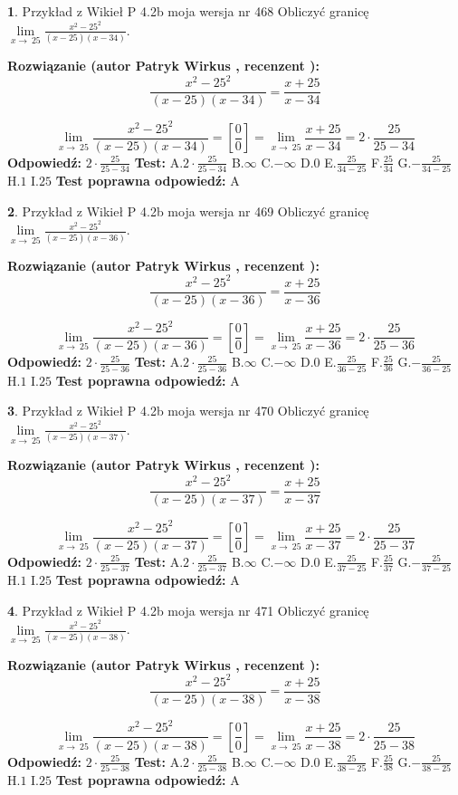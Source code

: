 \documentclass[12pt, a4paper]{article}
\theoremstyle{definition} %
\newtheorem{zad}{}
\newcommand{\zadStart}[1]{\begin{zad}#1\newline}
\newcommand{\zadStop}{\end{zad}}
\newcommand{\rozwStart}[2]{\noindent \textbf{Rozwiązanie (autor #1 , recenzent #2): }\newline}
\newcommand{\rozwStop}{\newline}
\newcommand{\odpStart}{\noindent \textbf{Odpowiedź:}\newline}
\newcommand{\odpStop}{\newline}
\newcommand{\testStart}{\noindent \textbf{Test:}\newline}
\newcommand{\testStop}{\newline}
\newcommand{\kluczStart}{\noindent \textbf{Test poprawna odpowiedź:}\newline}
\newcommand{\kluczStop}{\newline}
\begin{document}
\zadStart{Przykład z Wikieł P 4.2b moja wersja nr 468}
Obliczyć granicę $\lim\limits_{x\to\ 25}\frac{x^{2}-25^{2}}{(x-25)(x-34)}$.
\zadStop
\rozwStart{Patryk Wirkus}{}
$$\frac{x^{2}-25^{2}}{(x-25)(x-34)}=\frac{x+25}{x-34}$$

$$\lim\limits_{x\to\ 25}\frac{x^{2}-25^{2}}{(x-25)(x-34)}=[\frac{0}{0}]=\lim\limits_{x\to\ 25}\frac{x+25}{x-34}=2 \cdot \frac{25}{25-34}$$
\rozwStop
\odpStart
$2 \cdot \frac{25}{25-34}$
\odpStop
\testStart
A.$2 \cdot \frac{25}{25-34}$
B.$\infty$
C.$-\infty$
D.$0$
E.$\frac{25}{34-25}$
F.$\frac{25}{34}$
G.$-\frac{25}{34-25}$
H.$1$
I.$25$
\testStop
\kluczStart
A
\kluczStop



\zadStart{Przykład z Wikieł P 4.2b moja wersja nr 469}
Obliczyć granicę $\lim\limits_{x\to\ 25}\frac{x^{2}-25^{2}}{(x-25)(x-36)}$.
\zadStop
\rozwStart{Patryk Wirkus}{}
$$\frac{x^{2}-25^{2}}{(x-25)(x-36)}=\frac{x+25}{x-36}$$

$$\lim\limits_{x\to\ 25}\frac{x^{2}-25^{2}}{(x-25)(x-36)}=[\frac{0}{0}]=\lim\limits_{x\to\ 25}\frac{x+25}{x-36}=2 \cdot \frac{25}{25-36}$$
\rozwStop
\odpStart
$2 \cdot \frac{25}{25-36}$
\odpStop
\testStart
A.$2 \cdot \frac{25}{25-36}$
B.$\infty$
C.$-\infty$
D.$0$
E.$\frac{25}{36-25}$
F.$\frac{25}{36}$
G.$-\frac{25}{36-25}$
H.$1$
I.$25$
\testStop
\kluczStart
A
\kluczStop



\zadStart{Przykład z Wikieł P 4.2b moja wersja nr 470}
Obliczyć granicę $\lim\limits_{x\to\ 25}\frac{x^{2}-25^{2}}{(x-25)(x-37)}$.
\zadStop
\rozwStart{Patryk Wirkus}{}
$$\frac{x^{2}-25^{2}}{(x-25)(x-37)}=\frac{x+25}{x-37}$$

$$\lim\limits_{x\to\ 25}\frac{x^{2}-25^{2}}{(x-25)(x-37)}=[\frac{0}{0}]=\lim\limits_{x\to\ 25}\frac{x+25}{x-37}=2 \cdot \frac{25}{25-37}$$
\rozwStop
\odpStart
$2 \cdot \frac{25}{25-37}$
\odpStop
\testStart
A.$2 \cdot \frac{25}{25-37}$
B.$\infty$
C.$-\infty$
D.$0$
E.$\frac{25}{37-25}$
F.$\frac{25}{37}$
G.$-\frac{25}{37-25}$
H.$1$
I.$25$
\testStop
\kluczStart
A
\kluczStop



\zadStart{Przykład z Wikieł P 4.2b moja wersja nr 471}
Obliczyć granicę $\lim\limits_{x\to\ 25}\frac{x^{2}-25^{2}}{(x-25)(x-38)}$.
\zadStop
\rozwStart{Patryk Wirkus}{}
$$\frac{x^{2}-25^{2}}{(x-25)(x-38)}=\frac{x+25}{x-38}$$

$$\lim\limits_{x\to\ 25}\frac{x^{2}-25^{2}}{(x-25)(x-38)}=[\frac{0}{0}]=\lim\limits_{x\to\ 25}\frac{x+25}{x-38}=2 \cdot \frac{25}{25-38}$$
\rozwStop
\odpStart
$2 \cdot \frac{25}{25-38}$
\odpStop
\testStart
A.$2 \cdot \frac{25}{25-38}$
B.$\infty$
C.$-\infty$
D.$0$
E.$\frac{25}{38-25}$
F.$\frac{25}{38}$
G.$-\frac{25}{38-25}$
H.$1$
I.$25$
\testStop
\kluczStart
A
\kluczStop
\end{document}
